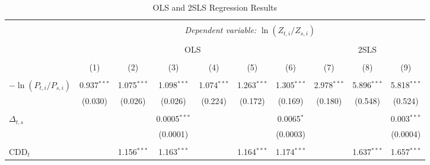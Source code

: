 \documentclass[11pt,a4paper,leqno]{extarticle}
\begin{document}
	\begin{landscape}
		
		\begin{table}[!h] \centering 
			\caption{OLS and 2SLS Regression Results}
			\label{table:regresults} 
			\small
			\begin{tabular}{@{\extracolsep{5pt}}lccccccccc} 
				\\[-4ex]\hline  
				\hline \\[-1.8ex] 
				& \multicolumn{9}{c}{\textit{Dependent variable:} $\ln (Z_{ t, i} / Z_{ s, i})$} \\ [0.5ex]
				\cline{2-10} \\ [-1.5ex]
				& \multicolumn{6}{c}{ OLS}   & \multicolumn{3}{c}{ 2SLS} \\ [0.5ex]
				\cline{2-7} \cline{8-10} 
				\\[-1.8ex] & (1) & (2) & (3) & (4) & (5) & (6) & (7) & (8) & (9) \\ [0.5ex]
				\hline \\[-1.8ex] 
				$-\ln (P_{t,i} / P_{s,i})$ & 0.937$^{***}$ & 1.075$^{***}$ & 1.098$^{***}$ & 1.074$^{***}$ & 1.263$^{***}$ & 1.305$^{***}$  & 2.978$^{***}$ & 5.896$^{***}$ & 5.818$^{***}$ \\ 
				& (0.030) & (0.026) & (0.026) & (0.224) & (0.172) & (0.169) & (0.180) & (0.548) & (0.524) \\ 
				& & & & & & \\ 
				$\Delta_{t,s}$ &  &  & 0.0005$^{***}$ &  &  & 0.0065$^{*}$ &  &  & 0.003$^{***}$ \\ 
				&  &  & (0.0001) &  &  & (0.0003)  &  &  & (0.0004) \\ 
				& & & & & & \\ 
				CDD$_t$ &  & 1.156$^{***}$ & 1.163$^{***}$ &  & 1.164$^{***}$ & 1.174$^{***}$  &  & 1.637$^{***}$ & 1.657$^{***}$ \\ 
				

\end{tabular}
\end{table}
\end{landscape}
\end{document}

